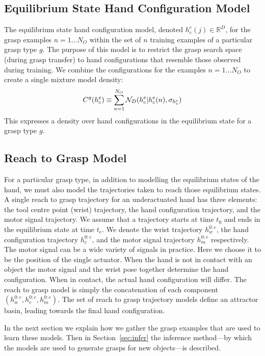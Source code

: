 
\subsection{Equilibrium State Hand Configuration Model}

The equilibrium state hand configuration model, denoted $h^e_c(j) \in \mathbb R^D$, for the grasp examples $n = 1 \ldots N_O$ within the set of $n$ training examples of a particular grasp type $g$. The purpose of this model is to restrict the grasp search space (during grasp transfer) to hand configurations that resemble those observed during training. We combine the configurations for the examples $n = 1 \ldots N_O$ to create a single mixture model density:
\begin{equation}
C^g(h^e_c) \equiv \sum_{n=1}^{N_O} \mathcal{N}_D(h^e_c|h^e_c(n), \sigma_{h^e_c}) 
\label{eq:hc}
\end{equation}
This expresses a density over hand configurations in the equilibrium state for a grasp type $g$.

\subsection{Reach to Grasp Model}

For a particular grasp type, in addition to modelling the equilibrium states of the hand, we must also model the trajectories taken to reach those equilibrium states. A single reach to grasp trajectory for an underactuated hand has three elements: the tool centre point (wrist) trajectory, the hand configuration trajectory, and the motor signal trajectory. We assume that a trajectory starts at time $t_0$ and ends in the equilibrium state at time $t_e$. We denote the wrist trajectory $h_w^{0:e}$, the hand configuration trajectory $h_c^{0:e}$, and the motor signal trajectory $h_m^{0:e}$ respectively. The motor signal can be a wide variety of signals in practice. Here we choose it to be the position of the single actuator. When the hand is not in contact with an object the motor signal and the wrist pose together determine the hand configuration. When in contact, the actual hand configuration will differ. The reach to grasp model is simply the concatenation of each component $(h_w^{0:e} , h_c^{0:e} , h_m^{0:e})$. The set of reach to grasp trajectory models define an attractor basin, leading towards the final hand configuration.

In the next section we explain how we gather the grasp examples that are used to learn these models. Then in Section~\ref{sec:infer} the inference method---by which the models are used to generate grasps for new objects---is described.
